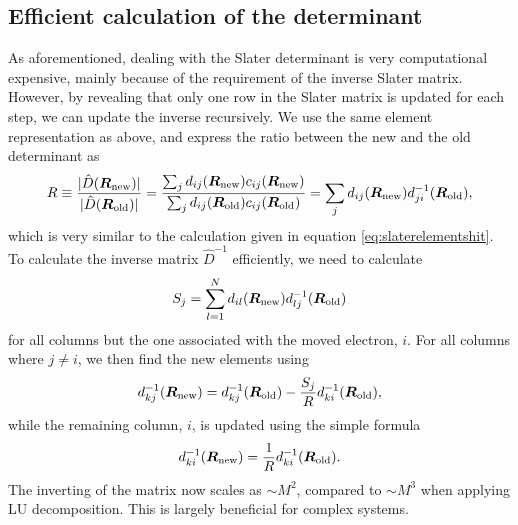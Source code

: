 \subsection{Efficient calculation of the determinant} \label{sec:efficientcalculationsofslaterdeterminant}
As aforementioned, dealing with the Slater determinant is very computational expensive, mainly because of the requirement of the inverse Slater matrix. However, by revealing that only one row in the Slater matrix is updated for each step, we can update the inverse recursively. We use the same element representation as above, and express the ratio between the new and the old determinant as
\begin{equation}
R\equiv \frac{|\hat{D}(\boldsymbol{{R}}_{\text{new}})|}{|\hat{D}(\boldsymbol{{R}}_{\text{old}})|}=\frac{\sum_{j}d_{ij}(\boldsymbol{{R}}_{\text{new}})c_{ij}(\boldsymbol{{R}}_{\text{new}})}{\sum_{j}d_{ij}(\boldsymbol{{R}}_{\text{old}})c_{ij}(\boldsymbol{{R}}_{\text{old}})}=\sum_{j}d_{ij}(\boldsymbol{{R}}_{\text{new}})d_{ji}^{-1}(\boldsymbol{{R}}_{\text{old}}),
\label{eq:slaterratio}
\end{equation}
which is very similar to the calculation given in equation \eqref{eq:slaterelementshit}. To calculate the inverse matrix $\hat{D}^{-1}$ efficiently, we need to calculate
\begin{equation}
S_j=\sum_{l=1}^Nd_{il}(\boldsymbol{{R}}_{\text{new}})d_{lj}^{-1}(\boldsymbol{{R}}_{\text{old}})
\label{eq:slaters}
\end{equation}
for all columns but the one associated with the moved electron, $i$. For all columns where $j\neq i$, we then find the new elements using
\begin{equation}
d_{kj}^{-1}(\boldsymbol{{R}}_{\text{new}})=d_{kj}^{-1}(\boldsymbol{{R}}_{\text{old}})-\frac{S_j}{R}d_{ki}^{-1}(\boldsymbol{{R}}_{\text{old}}),
\label{eq:slaterinverse}
\end{equation}
while the remaining column, $i$, is updated using the simple formula \supercite{morten_hjorth-jensen_computational_2019}
\begin{equation}
d_{ki}^{-1}(\boldsymbol{{R}}_{\text{new}})=\frac{1}{R}d_{ki}^{-1}(\boldsymbol{{R}}_{\text{old}}).
\label{eq:slaterinverse2}
\end{equation}
The inverting of the matrix now scales as $\sim M^2$, compared to $\sim M^3$ when applying LU decomposition. This is largely beneficial for complex systems.

